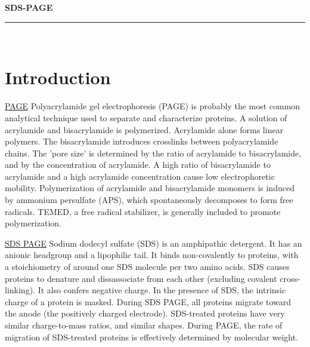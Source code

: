 \documentclass[a4paper,12pt]{article}
\newcommand{\protocol}{SDS-PAGE}
\begin{document}
 
 
 
\begin{titlepage}
\begin{center}
{\LARGE \textbf{\protocol} \\ \vspace{4pt}}
\rule[13pt]{\textwidth}{1pt} \\ \vspace{150pt}
\end{center}
 
\end{titlepage}
 
\newpage
\thispagestyle{empty}           %
\tableofcontents
\clearpage                      %
 
\setcounter{page}{1}
 
\section{Introduction}
\underline{PAGE}
Polyacrylamide gel electrophoresis (PAGE) is probably the most common analytical technique used to separate and characterize proteins. A solution of acrylamide and bisacrylamide is polymerized. Acrylamide alone forms linear polymers. The bisacrylamide introduces crosslinks between polyacrylamide chains. The 'pore size' is determined by the ratio of acrylamide to bisacrylamide, and by the concentration of acrylamide. A high ratio of bisacrylamide to acrylamide and a high acrylamide concentration cause low electrophoretic mobility. Polymerization of acrylamide and bisacrylamide monomers is induced by ammonium persulfate (APS), which spontaneously decomposes to form free radicals. TEMED, a free radical stabilizer, is generally included to promote polymerization.

\underline{SDS PAGE}
Sodium dodecyl sulfate (SDS) is an amphipathic detergent. It has an anionic headgroup and a lipophilic tail. It binds non-covalently to proteins, with a stoichiometry of around one SDS molecule per two amino acids. SDS causes proteins to denature and dissassociate from each other (excluding covalent cross-linking). It also confers negative charge. In the presence of SDS, the intrinsic charge of a protein is masked. During SDS PAGE, all proteins migrate toward the anode (the positively charged electrode). SDS-treated proteins have very similar charge-to-mass ratios, and similar shapes. During PAGE, the rate of migration of SDS-treated proteins is effectively determined by molecular weight.
\end{document}
